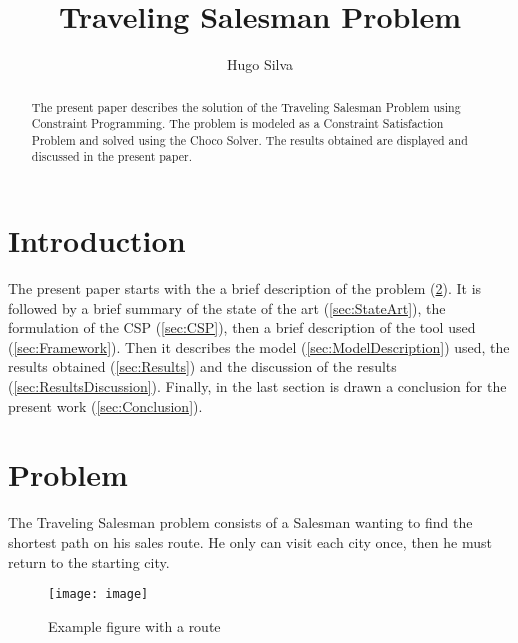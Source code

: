 \documentclass[runningheads,a4paper,english]{llncs}[2022/01/12]
\begin{document}
\title{Traveling Salesman Problem}

\author{Hugo Silva}


\maketitle

\begin{abstract}
  The present paper describes the solution of the Traveling Salesman Problem using Constraint Programming.
  The problem is modeled as a Constraint Satisfaction Problem and solved using the Choco Solver.
  The results obtained are displayed and discussed in the present paper.


\end{abstract}


\section{Introduction}
\label{sec:introduction}

The present paper starts with the a brief description of the problem (\cref{sec:problem}).
It is followed by a brief summary of the state of the art (\cref{sec:StateArt}), the formulation of the CSP (\cref{sec:CSP}), then a brief description of the tool used (\cref{sec:Framework}).\newline
Then it describes the model (\cref{sec:ModelDescription}) used, the results obtained (\cref{sec:Results}) and the discussion of the results (\cref{sec:ResultsDiscussion}).\newline
Finally, in the last section is drawn a conclusion for the present work (\cref{sec:Conclusion}).

\section{Problem}
\label{sec:problem}

The Traveling Salesman problem consists of a Salesman wanting to find the shortest path on his sales route. 
He only can visit each city once, then he must return to the starting city. \cite{BritannicaTSP}

\begin{figure}[H]
  \centering
  \texttt{[image: image]}
  \caption{Example figure with a route \cite{imageTSP}}
  \label{fig:ex:imageTSP}
\end{figure}
\end{document}
